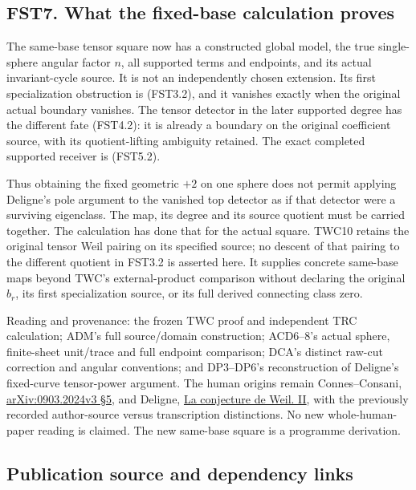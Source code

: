 \subsection{FST7. What the fixed-base calculation
proves}\label{fst7.-what-the-fixed-base-calculation-proves}

The same-base tensor square now has a constructed global model, the true
single-sphere angular factor \(n\), all supported terms and endpoints,
and its actual invariant-cycle source. It is not an independently chosen
extension. Its first specialization obstruction is (FST3.2), and it
vanishes exactly when the original actual boundary vanishes. The tensor
detector in the later supported degree has the different fate (FST4.2):
it is already a boundary on the original coefficient source, with its
quotient-lifting ambiguity retained. The exact completed supported
receiver is (FST5.2).

Thus obtaining the fixed geometric \(+2\) on one sphere does not permit
applying Deligne's pole argument to the vanished top detector as if that
detector were a surviving eigenclass. The map, its degree and its source
quotient must be carried together. The calculation has done that for the
actual square. TWC10 retains the original tensor Weil pairing on its
specified source; no descent of that pairing to the different quotient
in FST3.2 is asserted here. It supplies concrete same-base maps beyond
TWC's external-product comparison without declaring the original
\(b_r\), its first specialization source, or its full derived connecting
class zero.

Reading and provenance: the frozen TWC proof and independent TRC
calculation; ADM's full source/domain construction; ACD6--8's actual
sphere, finite-sheet unit/trace and full endpoint comparison; DCA's
distinct raw-cut correction and angular conventions; and DP3--DP6's
reconstruction of Deligne's fixed-curve tensor-power argument. The human
origins remain Connes--Consani,
\href{https://arxiv.org/abs/0903.2024v3}{arXiv:0903.2024v3 §5}, and
Deligne, \href{https://numdam.org/item/PMIHES_1980__52__137_0/}{La
conjecture de Weil. II}, with the previously recorded author-source
versus transcription distinctions. No new whole-human-paper reading is
claimed. The new same-base square is a programme derivation.

\subsection{Publication source and dependency
links}\label{publication-source-and-dependency-links}

